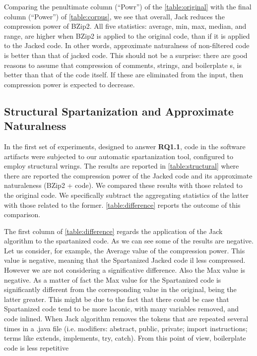 Comparing the penultimate column (``Powr'') of the \cref{table:original} 
with the final column (``Power'') of
\cref{table:corpus}, we see that overall, Jack reduces the compression power of
BZip2. All five statistics: average, min, max, median, and range, are higher
when BZip2 is applied to the original code, than if it is applied to the Jacked
code. In other words, approximate naturalness of non-filtered code is better
than that of jacked code. This should not be a surprise: there are good reasons
to assume that compression of comments, strings, and boilerplate s,
is better than that of the code itself. If these are eliminated from the input,
then compression power is expected to decrease.

\subsection{Structural Spartanization and Approximate Naturalness}

In the first set of experiments, designed to answer \textbf{RQ1.1}, \Java code
in the software artifacts were subjected to our automatic spartanization
tool, configured to employ structural wrings. 
The results are reported in \cref{table:structural} where there are reported 
the compression power of the Jacked code and its approximate 
naturaleness (BZip2 + code). 
We compared these results %
with those related to the original code.
We specifically subtract the aggregating statistics of the latter with those related to the former.
\cref{table:difference} reports the outcome of this comparison. 

The first column of \cref{table:difference} regards the application of the Jack algorithm to the spartanized code. 
As we can see some of the results are negative.
Let us consider, for example, the Average value of the compression power. 
This value is negative, meaning that the Spartanized Jacked code il less compressed.
However we are not considering a significative difference.
Also the Max value is negative. As a matter of fact the Max value for the Spartanized code is 
significantly different from the corresponding value in the original, being the latter greater.
This might be due to the fact that there could be case that Spartanized code 
tend to be more laconic, with many variables removed, and code inlined. 
When Jack algorithm removes the tokens that are repeated several times in a .java file 
(i.e. modifiers: abstract, public, private; import
instructions; terms like extends, implements, try, catch).
From this point of view, boilerplate code is less repetitive

